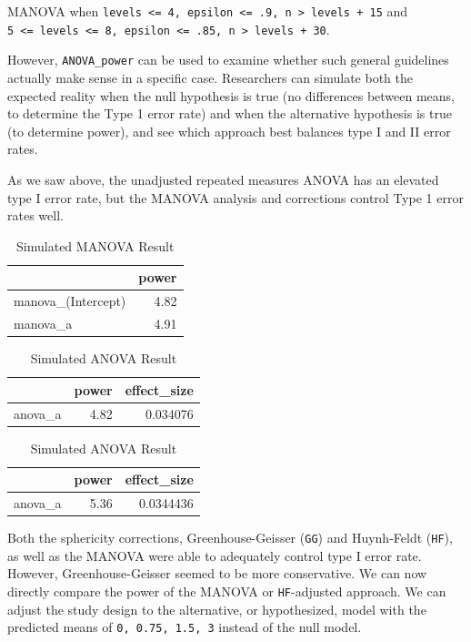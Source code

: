 \documentclass[
]{book}
\begin{document}
MANOVA when \texttt{levels\ \textless{}=\ 4,\ epsilon\ \textless{}=\ .9,\ n\ \textgreater{}\ levels\ +\ 15} and \texttt{5\ \textless{}=\ levels\ \textless{}=\ 8,\ epsilon\ \textless{}=\ .85,\ n\ \textgreater{}\ levels\ +\ 30}.

However, \texttt{ANOVA\_power} can be used to examine whether such general guidelines actually make sense in a specific case.
Researchers can simulate both the expected reality when the null hypothesis is true (no differences between means, to determine the Type 1 error rate) and when the alternative hypothesis is true (to determine power), and see which approach best balances type I and II error rates.

As we saw above, the unadjusted repeated measures ANOVA has an elevated type I error rate, but the MANOVA analysis and corrections control Type 1 error rates well.

\begin{table}[!h]

\caption{\label{tab:unnamed-chunk-293}Simulated MANOVA Result}
\centering
\begin{tabular}[t]{l|r}
\hline
  & power\\
\hline
manova\_(Intercept) & 4.82\\
\hline
manova\_a & 4.91\\
\hline
\end{tabular}
\end{table}
\begin{table}[!h]

\caption{\label{tab:unnamed-chunk-294}Simulated ANOVA Result}
\centering
\begin{tabular}[t]{l|r|r}
\hline
  & power & effect\_size\\
\hline
anova\_a & 4.82 & 0.034076\\
\hline
\end{tabular}
\end{table}
\begin{table}[!h]

\caption{\label{tab:unnamed-chunk-295}Simulated ANOVA Result}
\centering
\begin{tabular}[t]{l|r|r}
\hline
  & power & effect\_size\\
\hline
anova\_a & 5.36 & 0.0344436\\
\hline
\end{tabular}
\end{table}

\newpage

Both the sphericity corrections, Greenhouse-Geisser (\texttt{GG}) and Huynh-Feldt (\texttt{HF}), as well as the MANOVA were able to adequately control type I error rate.
However, Greenhouse-Geisser seemed to be more conservative.
We can now directly compare the power of the MANOVA or \texttt{HF}-adjusted approach. We can adjust the study design to the alternative, or hypothesized, model with the predicted means of \texttt{0,\ 0.75,\ 1.5,\ 3} instead of the null model.
\end{document}
